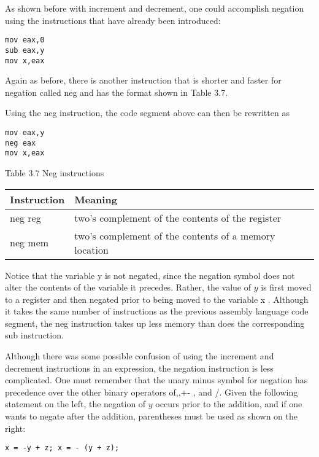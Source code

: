 \documentclass[10pt]{article}
\begin{document}
As shown before with increment and decrement, one could accomplish negation using the instructions that have already been introduced:

\begin{verbatim}
mov eax,0
sub eax,y
mov x,eax
\end{verbatim}

Again as before, there is another instruction that is shorter and faster for negation called neg and has the format shown in Table 3.7.

Using the neg instruction, the code segment above can then be rewritten as

\begin{verbatim}
mov eax,y
neg eax
mov x,eax
\end{verbatim}

Table 3.7 Neg instructions

\begin{center}
\begin{tabular}{|l|l|}
\hline
Instruction & Meaning \\
\hline
neg reg & two's complement of the contents of the register \\
\hline
neg mem & two's complement of the contents of a memory location \\
\hline
\end{tabular}
\end{center}

Notice that the variable y is not negated, since the negation symbol does not alter the contents of the variable it precedes. Rather, the value of $y$ is first moved to a register and then negated prior to being moved to the variable x . Although it takes the same number of instructions as the previous assembly language code segment, the neg instruction takes up less memory than does the corresponding sub instruction.

Although there was some possible confusion of using the increment and decrement instructions in an expression, the negation instruction is less complicated. One must remember that the unary minus symbol for negation has precedence over the other binary operators of,,+- , and /. Given the following statement on the left, the negation of $y$ occurs prior to the addition, and if one wants to negate after the addition, parentheses must be used as shown on the right:

\begin{verbatim}
x = -y + z; x = - (y + z);
\end{verbatim}
\end{document}
